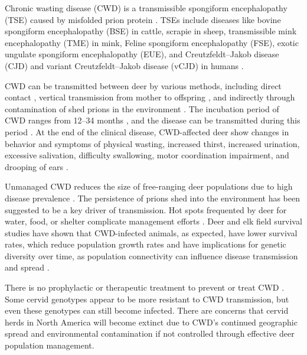 \documentclass[12pt,a4paper,reqno]{amsart}
\theoremstyle{definition}
\theoremstyle{remark}
\theoremstyle{plain}
\begin{document}
Chronic wasting disease (CWD) is a transmissible spongiform encephalopathy (TSE) caused by misfolded prion protein \cite{williams1980chronic}. TSEs include diseases like bovine spongiform encephalopathy (BSE) in cattle, scrapie in sheep, transmissible mink encephalopathy (TME) in mink, Feline spongiform encephalopathy (FSE), exotic ungulate spongiform encephalopathy (EUE), and Creutzfeldt–Jakob disease (CJD) and variant Creutzfeldt–Jakob disease (vCJD) in humans \cite{imran2011overview}.

CWD can be transmitted between deer by various methods, including direct contact \cite{williams2002chronic}, vertical transmission from mother to offspring \cite{nalls2013mother}, and indirectly through contamination of shed prions in the environment \cite{miller2004environmental}. The incubation period of CWD ranges from 12–34 months \cite{kahn2004chronic}, and the disease can be transmitted during this period \cite{mathiason2009infectious}. At the end of the clinical disease, CWD-affected deer show changes in behavior and symptoms of physical wasting, increased thirst, increased urination, excessive salivation, difficulty swallowing, motor coordination impairment, and drooping of ears \cite{gilch2011chronic}.

Unmanaged CWD reduces the size of free-ranging deer populations due to high disease prevalence \cite{edmunds2016chronic}. The persistence of prions shed into the environment has been suggested to be a key driver of transmission. Hot spots frequented by deer for water, food, or shelter complicate management efforts \cite{almberg2011modeling}. Deer and elk field survival studies have shown that CWD-infected animals, as expected, have lower survival rates, which reduce population growth rates and have implications for genetic diversity over time, as population connectivity can influence disease transmission and spread \cite{devivo2017endemic, rogers2011diversity}.

There is no prophylactic or therapeutic treatment to prevent or treat CWD \cite{joly2006spatial, belay2004chronic}. Some cervid genotypes appear to be more resistant to CWD transmission, but even these genotypes can still become infected. There are concerns that cervid herds in North America will become extinct due to CWD’s continued geographic spread and environmental contamination if not controlled through effective deer population management.
\end{document}
